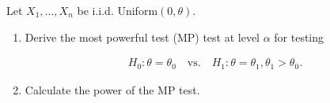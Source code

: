 
\begin{exercise}

Let $X_1,\dots,X_n$ be i.i.d. Uniform$(0,\theta)$.

\begin{enumerate}[label = (\alph*)]
    \item Derive the most powerful test (MP) test at level $\alpha$ for testing
    
    \begin{align*}
        H_0: \theta = \theta_0 \quad \text{vs.} \quad H_1: \theta = \theta_1, \theta_1 > \theta_0.
    \end{align*}
     \item Calculate the power of the MP test.
\end{enumerate}

\end{exercise}


\begin{solution}

\phantom{}

\end{solution}

